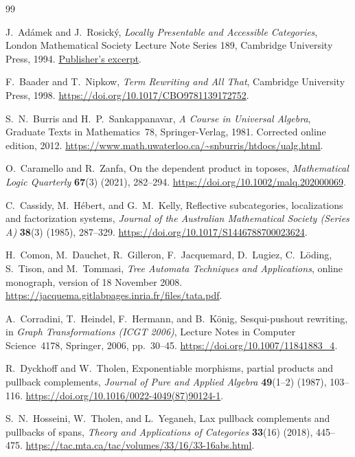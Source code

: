 \documentclass[11pt,a4paper]{article}
\theoremstyle{plain}
\theoremstyle{definition}
\theoremstyle{remark}
\begin{document}
\begin{thebibliography}{99}
\small
\raggedright
\setlength{\itemsep}{4pt plus 1pt}

J.~Ad\'amek and J.~Rosick\'y,
\emph{Locally Presentable and Accessible Categories},
London Mathematical Society Lecture Note Series 189,
Cambridge University Press, 1994.
\href{https://assets.cambridge.org/97805214/22611/excerpt/9780521422611_excerpt.pdf}{Publisher's excerpt}.

F.~Baader and T.~Nipkow,
\emph{Term Rewriting and All That}, Cambridge University Press, 1998.
\url{https://doi.org/10.1017/CBO9781139172752}.

S.~N.~Burris and H.~P.~Sankappanavar,
\emph{A Course in Universal Algebra}, Graduate Texts in Mathematics~78,
Springer-Verlag, 1981. Corrected online edition, 2012.
\url{https://www.math.uwaterloo.ca/~snburris/htdocs/ualg.html}.

O.~Caramello and R.~Zanfa,
On the dependent product in toposes,
\emph{Mathematical Logic Quarterly} \textbf{67}(3) (2021), 282--294.
\url{https://doi.org/10.1002/malq.202000069}.

C.~Cassidy, M.~H\'ebert, and G.~M.~Kelly,
Reflective subcategories, localizations and factorization systems,
\emph{Journal of the Australian Mathematical Society (Series A)}
\textbf{38}(3) (1985), 287--329.
\url{https://doi.org/10.1017/S1446788700023624}.

H.~Comon, M.~Dauchet, R.~Gilleron, F.~Jacquemard, D.~Lugiez,
C.~L\"oding, S.~Tison, and M.~Tommasi,
\emph{Tree Automata Techniques and Applications}, online monograph,
version of 18 November 2008.
\url{https://jacquema.gitlabpages.inria.fr/files/tata.pdf}.

A.~Corradini, T.~Heindel, F.~Hermann, and B.~K\"onig,
Sesqui-pushout rewriting, in \emph{Graph Transformations (ICGT 2006)},
Lecture Notes in Computer Science~4178, Springer, 2006, pp.~30--45.
\url{https://doi.org/10.1007/11841883_4}.

R.~Dyckhoff and W.~Tholen,
Exponentiable morphisms, partial products and pullback complements,
\emph{Journal of Pure and Applied Algebra} \textbf{49}(1--2) (1987), 103--116.
\url{https://doi.org/10.1016/0022-4049(87)90124-1}.

S.~N.~Hosseini, W.~Tholen, and L.~Yeganeh,
Lax pullback complements and pullbacks of spans,
\emph{Theory and Applications of Categories} \textbf{33}(16) (2018), 445--475.
\url{https://tac.mta.ca/tac/volumes/33/16/33-16abs.html}.


\end{thebibliography}
\end{document}

